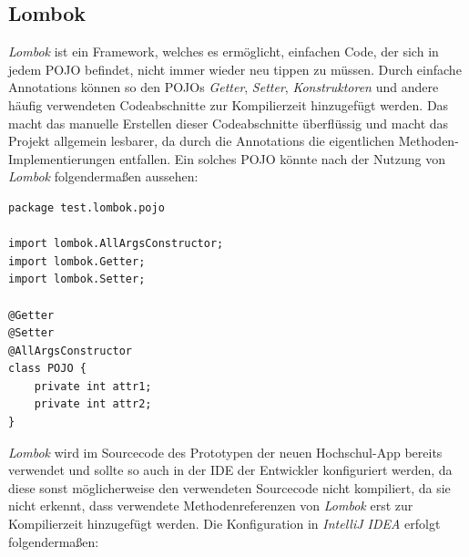 \subsection*{Lombok}
\label{sec:lombok}

\textit{Lombok} ist ein Framework, welches es ermöglicht, einfachen Code, der sich in jedem \ac{POJO} befindet, nicht immer wieder neu tippen zu müssen. Durch einfache Annotations können so den \acp{POJO} \textit{Getter}, \textit{Setter}, \textit{Konstruktoren} und andere häufig verwendeten Codeabschnitte zur Kompilierzeit hinzugefügt werden. Das macht das manuelle Erstellen dieser Codeabschnitte überflüssig und macht das Projekt allgemein lesbarer, da durch die Annotations die eigentlichen Methoden-Implementierungen entfallen\autocite[][]{lombok}. Ein solches \ac{POJO} könnte nach der Nutzung von \textit{Lombok} folgendermaßen aussehen:
\newpage

\begin{lstlisting}[caption={Klassendefinition mit \textit{Lombok}}]
package test.lombok.pojo

import lombok.AllArgsConstructor;
import lombok.Getter;
import lombok.Setter;

@Getter
@Setter
@AllArgsConstructor
class POJO {
	private int attr1;
	private int attr2;    
}
\end{lstlisting}

\textit{Lombok} wird im Sourcecode des Prototypen der neuen Hochschul-\ac{App} bereits verwendet und sollte so auch in der \ac{IDE} der Entwickler konfiguriert werden, da diese sonst möglicherweise den verwendeten Sourcecode nicht kompiliert, da sie nicht erkennt, dass verwendete Methodenreferenzen von \textit{Lombok} erst zur Kompilierzeit hinzugefügt werden. Die Konfiguration in \textit{IntelliJ IDEA} erfolgt folgendermaßen:

